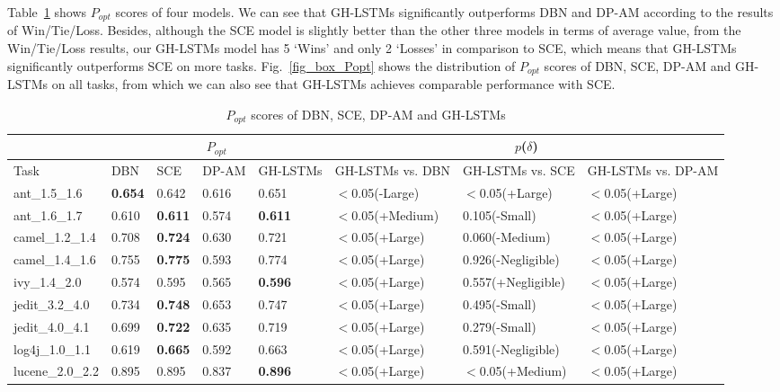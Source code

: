 \documentclass[journal]{IEEEtran}
\begin{document}
Table~\ref{tab_popt} shows $P_{opt}$ scores of four models. We can see that GH-LSTMs significantly outperforms DBN and DP-AM according to the results of Win/Tie/Loss. Besides, although the SCE model is slightly better than the other three models in terms of average value, from the Win/Tie/Loss results, our GH-LSTMs model has 5 `Wins' and only 2 `Losses' in comparison to SCE, which means that GH-LSTMs significantly outperforms SCE on more tasks. Fig.~\ref{fig_box_Popt} shows the distribution of $P_{opt}$ scores of DBN, SCE, DP-AM and GH-LSTMs on all tasks, from which we can also see that GH-LSTMs achieves comparable performance with SCE.

\begin{table}[t]
	\scriptsize
	\caption{$P_{opt}$ scores of DBN, SCE, DP-AM and GH-LSTMs}
	\label{tab_popt}
	\tabcolsep 9pt
	\centering
	\begin{tabular}{m{2cm}|llll|lll}
		\toprule
		&\multicolumn{4}{c|}{$P_{opt}$}  &\multicolumn{3}{c}{$p$($\delta$)}   \\\midrule
		Task  &DBN  &SCE  &DP-AM  &GH-LSTMs  &GH-LSTMs vs. DBN  &GH-LSTMs vs. SCE  &GH-LSTMs vs. DP-AM   \\\midrule
		ant\_1.5\_1.6     &\textbf{0.654}&0.642     &0.616     &0.651     &$<$0.05(-Large)&$<$0.05(+Large)&$<$0.05(+Large)\\
		ant\_1.6\_1.7     &0.610     &\textbf{0.611}&0.574     &\textbf{0.611}&$<$0.05(+Medium)&0.105(-Small)&$<$0.05(+Large)\\
		camel\_1.2\_1.4   &0.708     &\textbf{0.724}&0.630     &0.721     &$<$0.05(+Large)&0.060(-Medium)&$<$0.05(+Large)\\
		camel\_1.4\_1.6   &0.755     &\textbf{0.775}&0.593     &0.774     &$<$0.05(+Large)&0.926(-Negligible)&$<$0.05(+Large)\\
		ivy\_1.4\_2.0     &0.574     &0.595     &0.565     &\textbf{0.596}&$<$0.05(+Large)&0.557(+Negligible)&$<$0.05(+Large)\\
		jedit\_3.2\_4.0   &0.734     &\textbf{0.748}&0.653     &0.747     &$<$0.05(+Large)&0.495(-Small)&$<$0.05(+Large)\\
		jedit\_4.0\_4.1   &0.699     &\textbf{0.722}&0.635     &0.719     &$<$0.05(+Large)&0.279(-Small)&$<$0.05(+Large)\\
		log4j\_1.0\_1.1   &0.619     &\textbf{0.665}&0.592     &0.663     &$<$0.05(+Large)&0.591(-Negligible)&$<$0.05(+Large)\\
		lucene\_2.0\_2.2  &0.895     &0.895     &0.837     &\textbf{0.896}&$<$0.05(+Large)&$<$0.05(+Medium)&$<$0.05(+Large)\\

\end{tabular}
\end{table}
\end{document}
